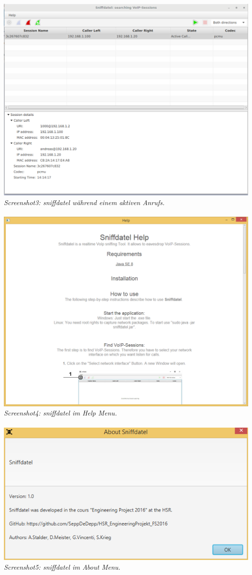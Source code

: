 \documentclass[a4,12pt]{scrartcl}
\begin{document}
\includegraphics[width=1\textwidth]{./pictures/gui2.png}\\
\textit{Screenshot3: sniffdatel während einem aktiven Anrufs.}\\
\\
\includegraphics[width=1\textwidth]{./pictures/help.png}\\
\textit{Screenshot4: sniffdatel im Help Menu.}\\
\\
\includegraphics[width=1\textwidth]{./pictures/about.png}\\
\textit{Screenshot5: sniffdatel im About Menu.}\\
\end{document}
